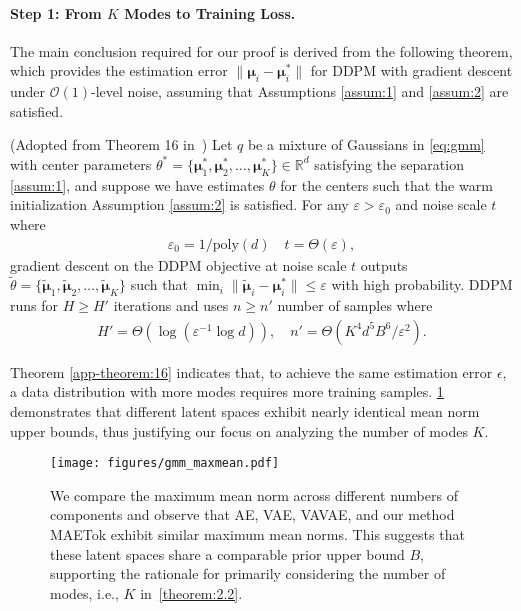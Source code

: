 \paragraph{Step 1: From $K$ Modes to Training Loss.}The main conclusion required for our proof is derived from the following theorem, which provides the estimation error $\|\boldsymbol{\mu}_i - \boldsymbol{\mu}_i^*\|$ for DDPM with gradient descent under $\mathcal{O}(1)$-level noise, assuming that Assumptions \ref{assum:1} and \ref{assum:2} are satisfied.
\begin{theorem}
\label{app-theorem:16}
(Adopted from Theorem 16  in~\citet{shah2023learning})
Let $q$ be a mixture of Gaussians in \cref{eq:gmm} with center parameters $\theta^* = \{\boldsymbol{\mu}_1^*, \boldsymbol{\mu}_2^*, \ldots, \boldsymbol{\mu}_K^*\} \in \mathbb{R}^d$ satisfying the separation \ref{assum:1}, and suppose we have estimates $\theta$ for the centers such that the warm initialization Assumption \ref{assum:2} is satisfied. For any $\varepsilon > \varepsilon_0$ and noise scale $t$ where
\begin{align*}
    \varepsilon_0 = 1/\text{poly}(d) \quad t = \Theta(\varepsilon),
\end{align*}
gradient descent on the DDPM objective at noise scale $t$ outputs $\tilde{\theta} = \{\tilde{\boldsymbol{\mu}}_1, \tilde{\boldsymbol{\mu}}_2, \ldots, \tilde{\boldsymbol{\mu}}_K\}$ such that $\min_i \|\tilde{\boldsymbol{\mu}}_i - \boldsymbol{\mu}_i^*\| \leq \varepsilon$ with high probability. DDPM runs for $H \geq H'$ iterations and uses $n \geq n'$ number of samples where
\begin{align*}
    H' = \Theta(\log(\varepsilon^{-1} \log d)),\quad  n' = \Theta(K^4d^5B^6/\varepsilon^2).
\end{align*}
\end{theorem}
Theorem \ref{app-theorem:16} indicates that, to achieve the same estimation error $\epsilon$, a data distribution with more modes requires more training samples. \cref{fig:norm bound} demonstrates that different latent spaces exhibit nearly identical mean norm upper bounds, thus justifying our focus on analyzing the number of modes $K$.
\begin{figure}[t]
    \centering
    \texttt{[image: figures/gmm\_maxmean.pdf]}
    \caption{We compare the maximum mean norm across different numbers of components and observe that AE, VAE, VAVAE, and our method MAETok exhibit similar maximum mean norms. This suggests that these latent spaces share a comparable prior upper bound \( B \), supporting the rationale for primarily considering the number of modes, i.e., $K$ in~\cref{theorem:2.2}.}
    \label{fig:norm bound} 
\end{figure}

